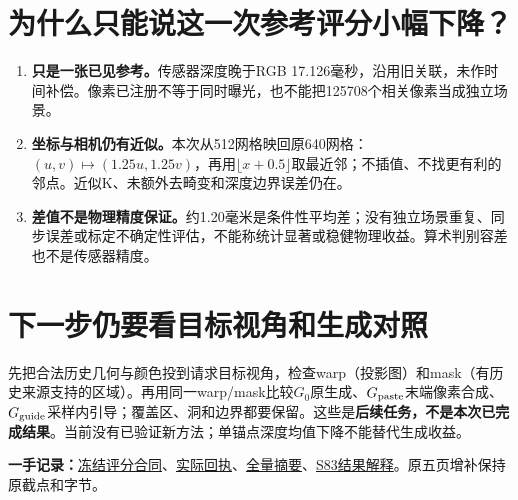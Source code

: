 \documentclass[UTF8,11pt,a4paper]{ctexart}
\begin{document}
\section{ 为什么只能说这一次参考评分小幅下降？}
\begin{enumerate}
\item \textbf{只是一张已见参考。}传感器深度晚于RGB 17.126毫秒，沿用旧关联，未作时间补偿。像素已注册不等于同时曝光，也不能把125708个相关像素当成独立场景。
\item \textbf{坐标与相机仍有近似。}本次从512网格映回原640网格：$(u,v)\mapsto(1.25u,1.25v)$，再用$\lfloor x+0.5\rfloor$取最近邻；不插值、不找更有利的邻点。近似K、未额外去畸变和深度边界误差仍在。
\item \textbf{差值不是物理精度保证。}约1.20毫米是条件性平均差；没有独立场景重复、同步误差或标定不确定性评估，不能称统计显著或稳健物理收益。算术判别容差也不是传感器精度。
\end{enumerate}

\section{ 下一步仍要看目标视角和生成对照}
先把合法历史几何与颜色投到请求目标视角，检查warp（投影图）和mask（有历史来源支持的区域）。再用同一warp/mask比较$G_0$原生成、$G_{\rm paste}$末端像素合成、$G_{\rm guide}$采样内引导；覆盖区、洞和边界都要保留。这些是\textbf{后续任务，不是本次已完成结果}。当前没有已验证新方法；单锚点深度均值下降不能替代生成收益。


\noindent\small\textbf{一手记录：}\href{/Users/rocket/Desktop/HKUST\%20IT/ip-/geometry-world-modeling/work/S84_anchor_depth_change/CONTRACT.json}{冻结评分合同}、\href{/Users/rocket/Desktop/HKUST\%20IT/ip-/geometry-world-modeling/work/S84_anchor_depth_change/execution_01/RECEIPT.json}{实际回执}、\href{/Users/rocket/Desktop/HKUST\%20IT/ip-/geometry-world-modeling/work/S84_anchor_depth_change/execution_01/SUMMARY.json}{全量摘要}、\href{/Users/rocket/Desktop/HKUST\%20IT/ip-/geometry-world-modeling/work/S83_fixed_camera_geometry/S83_RESULTS.md}{S83结果解释}。原五页增补保持原截点和字节。\normalsize
\end{document}
